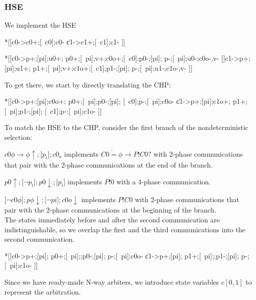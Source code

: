 \documentclass{article}
\begin{document}
\subsubsection*{HSE}

We implement the HSE

\begin{hse}
*[[c0\phi->c0+;[~c0\phi];c0-
  \|c1\phi->c1+;[~c1\phi];c1-
 ]]

*[[c0->p\phi+;[pi];u0+;
    p0+;[~pi];v+;c0o+;[~c0];p0-;[pi];
    p\phi-;[~pi];u0-;c0o-,v-
  []c1->p\phi+;[pi];u1+;
    p1+;[~pi];v+;c1o+;[~c1];p1-;[pi];
    p\phi-;[~pi];u1-;c1o-,v-
 ]]
\end{hse}

\noindent
To get there, we start by directly translating the CHP:

\begin{hse}
*[[c0\phi->p\phi+;[pi];c0o+;
    p0+;[~pi];p0-;[pi];
    [~c0\phi];p\phi-;[~pi];c0o-
  \|c1\phi->p\phi+;[pi];c1o+;
    p1+;[~pi];p1-;[pi];
    [~c1\phi];p\phi-;[~pi];c1o-
 ]]
\end{hse}

\noindent
To match the HSE to the CHP, consider the first branch of the nondeterministic
selection: 

$c0\phi\rightarrow\phi\uparrow;\texttt{[}p_i\texttt{]};c0_o$ implements 
$\overline{C0=\phi}\longrightarrow P!C0?$ with 2-phase communications that
pair with the 2-phase communications at the end of the branch.

$p0\uparrow;\texttt{[}\neg p_i\texttt{]};p0\downarrow;\texttt{[}p_i\texttt{]}$ implements $P!0$ with a 4-phase communication.

$\texttt{[}\neg c0\phi\texttt{]};p\phi\downarrow;\texttt{[}\neg pi\texttt{]};c0o\downarrow$ implements $P!C0$ with 2-phase communications that pair with the 
2-phase communications at the beginning of the branch. \\

\noindent
The states immediately before and after the second communication are 
indistinguishable, so we overlap the first and the third communications into 
the second communication.

\begin{hse}
*[[c0\phi->p\phi+;[pi];
    p0+;[~pi];;p0-;[pi];
    p\phi-;[~pi];c0o-
  \|c1\phi->p\phi+;[pi];
    p1+;[~pi];;p1-;[pi];
    p\phi-;[~pi];c1o-
 ]]
\end{hse}

\noindent
Since we have ready-made N-way arbiters, we introduce state variables $c[0,1]$
to represent the arbitration.
\end{document}
